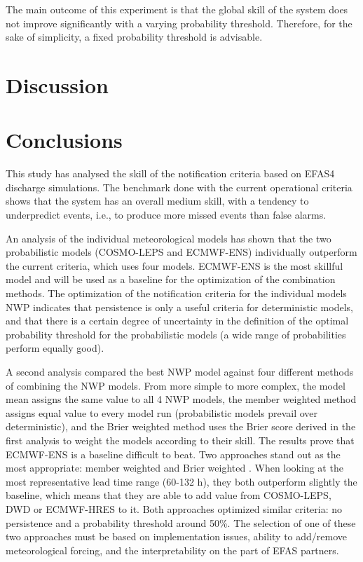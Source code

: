 \documentclass[preprint,12pt]{elsarticle}
\begin{document}
The main outcome of this experiment is that the global skill of the system does not improve significantly with a varying probability threshold. Therefore, for the sake of simplicity, a fixed probability threshold is advisable.

\section{Discussion}
\label{sec:discussion}

\section{Conclusions}
\label{sec:conclusions}

This study has analysed the skill of the notification criteria based on EFAS4 discharge simulations. The benchmark done with the current operational criteria shows that the system has an overall medium skill, with a tendency to underpredict events, i.e., to produce more missed events than false alarms.

An analysis of the individual meteorological models has shown that the two probabilistic models (COSMO-LEPS and ECMWF-ENS) individually outperform the current criteria, which uses four models. ECMWF-ENS is the most skillful model and will be used as a baseline for the optimization of the combination methods. The optimization of the notification criteria for the individual models NWP indicates that persistence is only a useful criteria for deterministic models, and that there is a certain degree of uncertainty in the definition of the optimal probability threshold for the probabilistic models (a wide range of probabilities perform equally good).

A second analysis compared the best NWP model against four different methods of combining the NWP models. From more simple to more complex, the model mean assigns the same value to all 4 NWP models, the member weighted method assigns equal value to every model run (probabilistic models prevail over deterministic), and the Brier weighted method uses the Brier score derived in the first analysis to weight the models according to their skill. The results prove that ECMWF-ENS is a baseline difficult to beat. Two approaches stand out as the most appropriate: member weighted  and Brier weighted . When looking at the most representative lead time range (60-132 h), they both outperform slightly the baseline, which means that they are able to add value from COSMO-LEPS, DWD or ECMWF-HRES to it. Both approaches optimized similar criteria: no persistence and a probability threshold around 50\%. The selection of one of these two approaches must be based on implementation issues, ability to add/remove meteorological forcing, and the interpretability on the part of EFAS partners.
\end{document}
